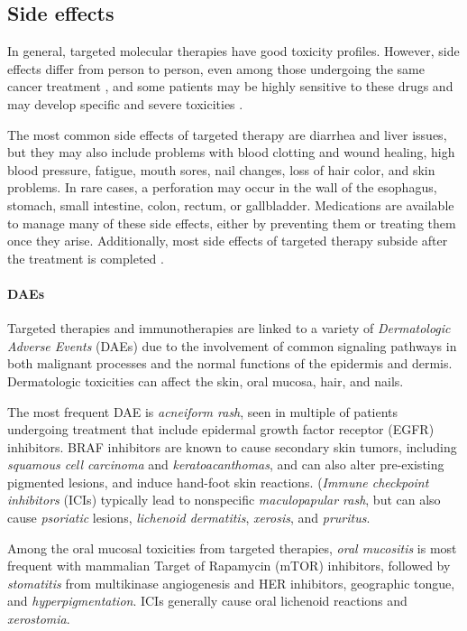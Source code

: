 \subsection{Side effects}

In general, targeted molecular therapies have good toxicity profiles. However, side effects differ from person to person, even among those undergoing the same cancer treatment \cite{nih_se}, and some patients may be highly sensitive to these drugs and may develop specific and severe toxicities \cite{se_tt}.

The most common side effects of targeted therapy are diarrhea and liver issues, but they may also include problems with blood clotting and wound healing, high blood pressure, fatigue, mouth sores, nail changes, loss of hair color, and skin problems. In rare cases, a perforation may occur in the wall of the esophagus, stomach, small intestine, colon, rectum, or gallbladder. Medications are available to manage many of these side effects, either by preventing them or treating them once they arise. Additionally, most side effects of targeted therapy subside after the treatment is completed \cite{target_therapy1}.

\paragraph{DAEs}

Targeted therapies and immunotherapies are linked to a variety of \textit{Dermatologic Adverse Events} (DAEs) due to the involvement of common signaling pathways in both malignant processes and the normal functions of the epidermis and dermis. Dermatologic toxicities can affect the skin, oral mucosa, hair, and nails.

The most frequent DAE is \textit{acneiform rash}, seen in multiple of patients undergoing treatment that include epidermal growth factor receptor (EGFR) inhibitors. BRAF inhibitors are known to cause secondary skin tumors, including \textit{squamous cell carcinoma} and \textit{keratoacanthomas}, and can also alter pre-existing pigmented lesions, and induce hand-foot skin reactions. (\textit{Immune checkpoint inhibitors} (ICIs) typically lead to nonspecific \textit{maculopapular rash}, but can also cause \textit{psoriatic} lesions, \textit{lichenoid dermatitis}, \textit{xerosis}, and \textit{pruritus}.

Among the oral mucosal toxicities from targeted therapies, \textit{oral mucositis} is most frequent with mammalian Target of Rapamycin (mTOR) inhibitors, followed by \textit{stomatitis} from multikinase angiogenesis and HER inhibitors, geographic tongue, and \textit{hyperpigmentation}. ICIs generally cause oral lichenoid reactions and \textit{xerostomia}.


